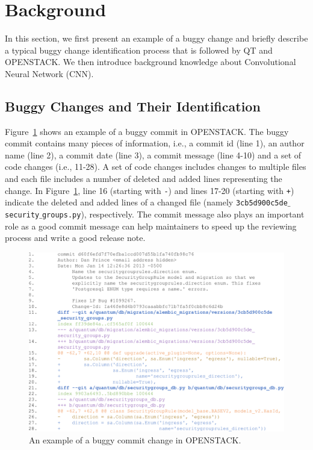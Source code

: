 

\section{Background}
\label{sec:background}

In this section, we first present an example of a buggy  change and briefly describe a typical buggy change identification process that is followed by QT and OPENSTACK. We then introduce background knowledge about Convolutional Neural Network (CNN). 

\subsection{Buggy Changes and Their Identification}
\label{sec:examle}

Figure~\ref{fig:example} shows an example of a buggy commit in OPENSTACK. The buggy commit contains many pieces of information, i.e., a commit id (line 1), an author name (line 2), a commit date (line 3), a commit message (line 4-10) and a set of code changes (i.e., 11-28). A set of code changes includes changes to multiple files and each file includes a number of deleted and added lines representing the change. In Figure~\ref{fig:example}, line 16 (starting with \texttt{-}) and lines 17-20 (starting with \texttt{+}) indicate the deleted and added lines of a changed file (namely \texttt{3cb5d900c5de$\_$security$\_$groups.py}), respectively. The commit message also plays an important role as a good commit message can help maintainers to speed up the reviewing process and write a good release note.

\begin{figure}[ht]
\center
\includegraphics[scale=0.2]{figs/example.pdf}
\caption{An example of a buggy commit change in OPENSTACK.}
\label{fig:example}
\end{figure} 


